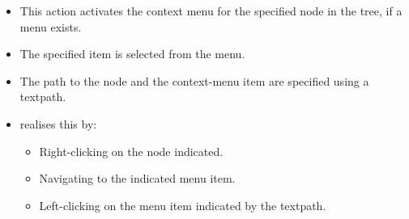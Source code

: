 \begin{itemize}
\item This action activates the context menu for the specified node in the tree, if a menu exists.
\item The specified item is  selected from the menu.
\item The path to the node and the context-menu item are specified using a textpath.
\item \gd{} realises this by:
  \begin{itemize}
    \item Right-clicking on the node indicated.
    \item Navigating to the indicated menu item.
    \item Left-clicking on the menu item indicated by the textpath.
  \end{itemize}
\end{itemize}
 